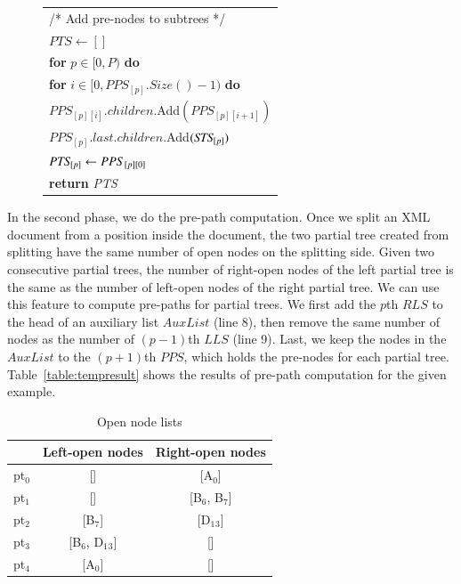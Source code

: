 \begin{figure}[t]
\begin{tabular}{l}
 		\makebox[1em][r]{11:}\hspace{1 mm}  /* Add pre-nodes to subtrees */ \\
 		\makebox[1em][r]{12:}\hspace{1 mm} $PTS \leftarrow []$ \\
 		\makebox[1em][r]{13:}\hspace{1 mm} \textbf{for} $ p \in [0, P) $ \textbf{do}\\
 		\makebox[1em][r]{14:}\hspace{4 mm} \textbf{for} $ i \in [0, PPS_{[p]}.Size() - 1)$ \textbf{do} \\
 		\makebox[1em][r]{15:}\hspace{8 mm}   $PPS_{[p][i]}.children.$Add$(PPS_{[p][i+1]})$ \\
  		\makebox[1em][r]{16:}\hspace{4 mm} $PPS_{[p]}.last.children.$Add$(\mathit{STS}_{[p]})$ \\
 		\makebox[1em][r]{17:}\hspace{4 mm}   $\mathit{PTS}_{[p]} \leftarrow PPS_{[p][0]}$ \\
 		\makebox[1em][r]{18:}\hspace{1 mm} \textbf{return} \emph{PTS} \\
 		\hline
 	\end{tabular}
 \end{figure}

In the second phase, we do the pre-path computation. Once we split an XML document from a position
inside the document, the two partial tree created from splitting have the same number of open nodes 
on the splitting side. Given two consecutive partial trees, the number of right-open nodes of the left partial tree is the same as the number of left-open nodes of the right partial tree. 
We can use this feature to compute pre-paths for partial trees.
We first add the $p$th $RLS$ to the head of an auxiliary list $AuxList$ (line 8), 
then remove the same number of nodes as the number of $(p-1)$th $LLS$ (line 9). 
Last, we keep the nodes in the $AuxList$ to the $(p+1)$th $PPS$, which holds the pre-nodes for each partial tree.
Table~\ref{table:tempresult} shows the results of pre-path computation for the given example.

\begin{table}[t]
	\caption{Open node lists}
	\label{table:opennodes}
	\centering
	\begin{tabular}{c|cc}
		\hline
		& Left-open nodes	& Right-open nodes \\
		\hline
		pt$_0$	& []			& [A$_0$] \\
		pt$_1$	& []			& [B$_6$, B$_7$] \\
		pt$_2$	& [B$_7$]			& [D$_1$$_3$] \\
		pt$_3$	& [B$_6$, D$_1$$_3$]		& [] \\
		pt$_4$	& [A$_0$]			& [] \\
		\hline
	\end{tabular}
\end{table}
 
